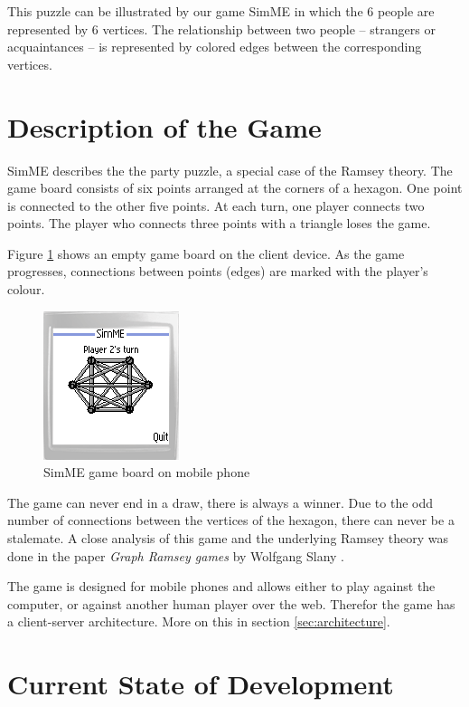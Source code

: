 		This puzzle can be illustrated by our game SimME in which the 6 people
		are represented by 6 vertices. The relationship between two people --
		strangers or acquaintances -- is represented by colored edges between
		the corresponding vertices.


\section{Description of the Game}

	SimME describes the the party puzzle, a special case of the Ramsey theory.
	The game board consists of six points arranged at the corners of a hexagon.
	One point is connected to the other five points. At each turn, one player
	connects two points. The player who connects three points with a triangle
	loses the game.
	
	Figure \ref{fig:gameboard} shows an empty game board on the client device.
	As the game progresses, connections between points (edges) are marked with
	the player's colour.

	\begin{figure}[h]
	\begin{center}
		\includegraphics{pics/simme-screen.png}
		\caption{SimME game board on mobile phone}
		\label{fig:gameboard}
	\end{center}
	\end{figure}

	The game can never end in a draw, there is always a winner. Due to the
	odd number of connections between the vertices of the hexagon, there can
	never be a stalemate. A close analysis of this game and the underlying
	Ramsey theory was done in the paper \emph{Graph Ramsey games} by
	Wolfgang Slany \cite{slany_paper}.

	The game is designed for mobile phones and allows either to play against
	the computer, or against another human player over the web. Therefor the
	game has a client-server architecture. More on this in section
	\ref{sec:architecture}.


\section{Current State of Development}

